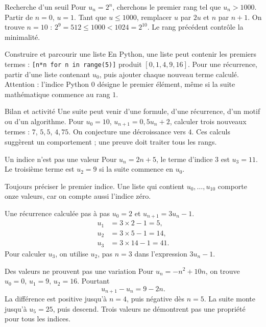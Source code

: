\documentclass[aspectratio=169,12pt]{beamer}
\begin{document}
\renewcommand{\slidekind}{COMPRENDRE}
\begin{frame}[t,fragile]{Recherche d’un seuil}
Pour $u_n=2^n$, cherchons le premier rang tel que $u_n>1000$. Partir de $n=0$, $u=1$. Tant que $u\le1000$, remplacer $u$ par $2u$ et $n$ par $n+1$. On trouve $n=10$ : $2^9=512\le1000<1024=2^{10}$. Le rang précédent contrôle la minimalité.
\end{frame}
\renewcommand{\slidekind}{COMPRENDRE}
\begin{frame}[t,fragile]{Construire et parcourir une liste}
En Python, une liste peut contenir les premiers termes : \texttt{[n*n for n in range(5)]} produit $[0,1,4,9,16]$. Pour une récurrence, partir d’une liste contenant $u_0$, puis ajouter chaque nouveau terme calculé. Attention : l’indice Python $0$ désigne le premier élément, même si la suite mathématique commence au rang $1$.
\end{frame}
\renewcommand{\slidekind}{À RETENIR}
\begin{frame}[t,fragile]{Bilan et activité}
Une suite peut venir d’une formule, d’une récurrence, d’un motif ou d’un algorithme. Pour $u_0=10$, $u_{n+1}=0,5u_n+2$, calculer trois nouveaux termes : $7$, $5,5$, $4,75$. On conjecture une décroissance vers $4$. Ces calculs suggèrent un comportement ; une preuve doit traiter tous les rangs.
\end{frame}
\renewcommand{\slidekind}{COMPRENDRE}
\begin{frame}[t,fragile]{Un indice n’est pas une valeur}
Pour $u_n=2n+5$, le terme d’indice $3$ est $u_3=11$. Le troisième terme est $u_2=9$ si la suite commence en $u_0$.\medskip\par Toujours préciser le premier indice. Une liste qui contient $u_0,\ldots,u_{10}$ comporte onze valeurs, car on compte aussi l’indice zéro.
\end{frame}
\renewcommand{\slidekind}{MÉTHODE \& EXEMPLE}
\begin{frame}[t,fragile]{Une récurrence calculée pas à pas}
$u_0=2$ et $u_{n+1}=3u_n-1$.\[\begin{aligned}u_1&=3\times2-1=5,\\u_2&=3\times5-1=14,\\u_3&=3\times14-1=41.\end{aligned}\] Pour calculer $u_3$, on utilise $u_2$, pas $n=3$ dans l’expression $3u_n-1$.
\end{frame}
\renewcommand{\slidekind}{COMPRENDRE}
\begin{frame}[t,fragile]{Des valeurs ne prouvent pas une variation}
Pour $u_n=-n^2+10n$, on trouve $u_0=0$, $u_1=9$, $u_2=16$. Pourtant\[u_{n+1}-u_n=9-2n.\] La différence est positive jusqu’à $n=4$, puis négative dès $n=5$. La suite monte jusqu’à $u_5=25$, puis descend. Trois valeurs ne démontrent pas une propriété pour tous les indices.
\end{frame}
\end{document}
